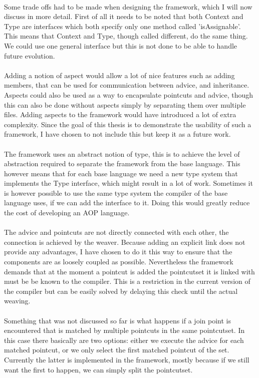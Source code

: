 \documentclass[a4paper]{report}
\begin{document}
\\
Some trade offs had to be made when designing the framework, which I will now discuss in more detail. First of all it needs to be noted that both Context and Type are interfaces which both specify only one method called 'isAssignable'. This means that Context and Type, though called different, do the same thing. We could use one general interface but this is not done to be able to handle future evolution.\\
\\
Adding a notion of aspect would allow a lot of nice features such as adding members, that can be used for communication between advice, and inheritance. Aspects could also be used as a way to encapsulate pointcuts and advice, though this can also be done without aspects simply by separating them over multiple files. Adding aspects to the framework would have introduced a lot of extra complexity. Since the goal of this thesis is to demonstrate the usability of such a framework, I have chosen to not include this but keep it as a future work.\\
\\
The framework uses an abstract notion of type, this is to achieve the level of abstraction required to separate the framework from the base language. This however means that for each base language we need a new type system that implements the Type interface, which might result in a lot of work. Sometimes it is however possible to use the same type system the compiler of the base language uses, if we can add the interface to it. Doing this would greatly reduce the cost of developing an AOP language.\\
\\
The advice and pointcuts are not directly connected with each other, the connection is achieved by the weaver. Because adding an explicit link does not provide any advantages, I have chosen to do it this way to ensure that the components are as loosely coupled as possible. Nevertheless the framework demands that at the moment a pointcut is added the pointcutset it is linked with must be be known to the compiler. This is a restriction in the current version of the compiler but can be easily solved by delaying this check until the actual weaving.\\
\\
Something that was not discussed so far is what happens if a join point is encountered that is matched by multiple pointcuts in the same pointcutset. In this case there basically are two options: either we execute the advice for each matched pointcut, or we only select the first matched pointcut of the set. Currently the latter is implemented in the framework, mostly because if we still want the first to happen, we can simply split the pointcutset.\\
\end{document}
